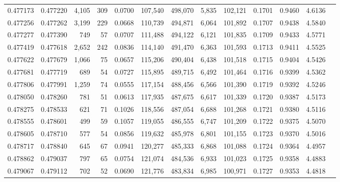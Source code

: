 \begin{tabular}{rrrrrrrrrrrrr}
0.477173 & 0.477220 & 4,105 &   309 &                                     0.0700 & 107,540 & 498,070 &   5,835 & 102,121 & 0.1701 & 0.9460 & 4.6136 \\
0.477256 & 0.477262 & 3,199 &   229 &                                     0.0668 & 110,739 & 494,871 &   6,064 & 101,892 & 0.1707 & 0.9438 & 4.5840 \\
0.477277 & 0.477390 &   749 &    57 &                                     0.0707 & 111,488 & 494,122 &   6,121 & 101,835 & 0.1709 & 0.9433 & 4.5771 \\
0.477419 & 0.477618 & 2,652 &   242 &                                     0.0836 & 114,140 & 491,470 &   6,363 & 101,593 & 0.1713 & 0.9411 & 4.5525 \\
0.477622 & 0.477679 & 1,066 &    75 &                                     0.0657 & 115,206 & 490,404 &   6,438 & 101,518 & 0.1715 & 0.9404 & 4.5426 \\
0.477681 & 0.477719 &   689 &    54 &                                     0.0727 & 115,895 & 489,715 &   6,492 & 101,464 & 0.1716 & 0.9399 & 4.5362 \\
0.477806 & 0.477991 & 1,259 &    74 &                                     0.0555 & 117,154 & 488,456 &   6,566 & 101,390 & 0.1719 & 0.9392 & 4.5246 \\
0.478050 & 0.478260 &   781 &    51 &                                     0.0613 & 117,935 & 487,675 &   6,617 & 101,339 & 0.1720 & 0.9387 & 4.5173 \\
0.478275 & 0.478533 &   621 &    71 &                                     0.1026 & 118,556 & 487,054 &   6,688 & 101,268 & 0.1721 & 0.9380 & 4.5116 \\
0.478555 & 0.478601 &   499 &    59 &                                     0.1057 & 119,055 & 486,555 &   6,747 & 101,209 & 0.1722 & 0.9375 & 4.5070 \\
0.478605 & 0.478710 &   577 &    54 &                                     0.0856 & 119,632 & 485,978 &   6,801 & 101,155 & 0.1723 & 0.9370 & 4.5016 \\
0.478717 & 0.478840 &   645 &    67 &                                     0.0941 & 120,277 & 485,333 &   6,868 & 101,088 & 0.1724 & 0.9364 & 4.4957 \\
0.478862 & 0.479037 &   797 &    65 &                                     0.0754 & 121,074 & 484,536 &   6,933 & 101,023 & 0.1725 & 0.9358 & 4.4883 \\
0.479067 & 0.479112 &   702 &    52 &                                     0.0690 & 121,776 & 483,834 &   6,985 & 100,971 & 0.1727 & 0.9353 & 4.4818 \\

\end{tabular}
